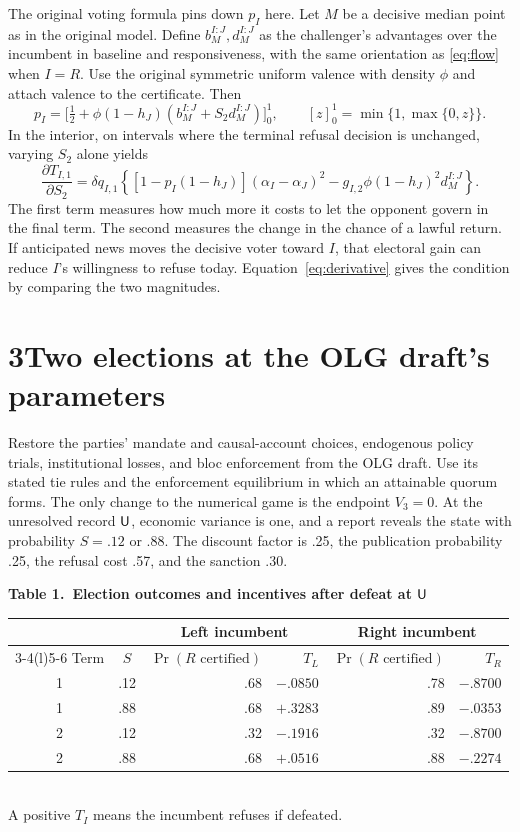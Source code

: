 \documentclass[11pt,letterpaper]{article}
\newcommand{\Rcert}{R\text{ certified}}\newcommand{\Lcert}{L\text{ certified}}
\begin{document}
The original voting formula pins down \(p_I\) here. Let \(M\) be a decisive median point as in the original model. Define \(b_M^{I:J},d_M^{I:J}\) as the challenger's advantages over the incumbent in baseline and responsiveness, with the same orientation as \eqref{eq:flow} when \(I=R\). Use the original symmetric uniform valence with density \(\phi\) and attach valence to the certificate. Then
\[
 p_I=\big[\tfrac12+\phi(1-h_J)(b_M^{I:J}+S_2d_M^{I:J})\big]_0^1,
 \qquad [z]_0^1=\min\{1,\max\{0,z\}\}.
\]
In the interior, on intervals where the terminal refusal decision is unchanged, varying \(S_2\) alone yields
\begin{equation}
 \frac{\partial T_{I,1}}{\partial S_2}
 =\delta q_{I,1}\left\{[1-p_I(1-h_J)](\alpha_I-\alpha_J)^2
       -g_{I,2}\phi(1-h_J)^2 d_M^{I:J}\right\}. \label{eq:derivative}
\end{equation}
The first term measures how much more it costs to let the opponent govern in the final term. The second measures the change in the chance of a lawful return. If anticipated news moves the decisive voter toward \(I\), that electoral gain can reduce \(I\)'s willingness to refuse today. Equation~\eqref{eq:derivative} gives the condition by comparing the two magnitudes.

\newpage
\section*{3\quad Two elections at the OLG draft's parameters}
Restore the parties' mandate and causal-account choices, endogenous policy trials, institutional losses, and bloc enforcement from the OLG draft. Use its stated tie rules and the enforcement equilibrium in which an attainable quorum forms. The only change to the numerical game is the endpoint \(V_3=0\). At the unresolved record \(\mathsf U\), economic variance is one, and a report reveals the state with probability \(S=.12\) or \(.88\). The discount factor is .25, the publication probability .25, the refusal cost .57, and the sanction .30.

\begin{center}\small
\textbf{Table 1.\ Election outcomes and incentives after defeat at \(\mathsf U\)}\\[5pt]
\begin{tabular}{@{}cc rr rr@{}}\toprule
 & &\multicolumn{2}{c}{Left incumbent}&\multicolumn{2}{c}{Right incumbent}\\
\cmidrule(lr){3-4}\cmidrule(l){5-6}
Term & \(S\) & \(\Pr(\Rcert)\) & \(T_L\) & \(\Pr(\Rcert)\) & \(T_R\)\\\midrule
1 & .12 & .68 & $-.0850$ & .78 & $-.8700$\\
1 & .88 & .68 & $+.3283$ & .89 & $-.0353$\\[2pt]
2 & .12 & .32 & $-.1916$ & .32 & $-.8700$\\
2 & .88 & .68 & $+.0516$ & .88 & $-.2274$\\\bottomrule
\end{tabular}\\[3pt]
A positive \(T_I\) means the incumbent refuses if defeated.
\end{center}
\end{document}
